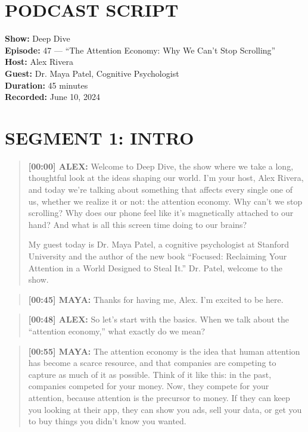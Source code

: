 \documentclass[
    language=english,
    doctype=podcast-script,
    institution=none,
]{../../omnilatex}
\begin{document}
\maketitle

\section*{PODCAST SCRIPT}

\textbf{Show:} Deep Dive\\
\textbf{Episode:} 47 --- ``The Attention Economy: Why We Can't Stop Scrolling''\\
\textbf{Host:} Alex Rivera\\
\textbf{Guest:} Dr. Maya Patel, Cognitive Psychologist\\
\textbf{Duration:} 45 minutes\\
\textbf{Recorded:} June 10, 2024

\section*{SEGMENT 1: INTRO}

\begin{quote}
\textbf{[00:00] ALEX:} Welcome to Deep Dive, the show where we take a long, thoughtful look at the ideas shaping our world. I'm your host, Alex Rivera, and today we're talking about something that affects every single one of us, whether we realize it or not: the attention economy. Why can't we stop scrolling? Why does our phone feel like it's magnetically attached to our hand? And what is all this screen time doing to our brains?

My guest today is Dr. Maya Patel, a cognitive psychologist at Stanford University and the author of the new book ``Focused: Reclaiming Your Attention in a World Designed to Steal It.'' Dr. Patel, welcome to the show.
\end{quote}

\begin{quote}
\textbf{[00:45] MAYA:} Thanks for having me, Alex. I'm excited to be here.
\end{quote}

\begin{quote}
\textbf{[00:48] ALEX:} So let's start with the basics. When we talk about the ``attention economy,'' what exactly do we mean?
\end{quote}

\begin{quote}
\textbf{[00:55] MAYA:} The attention economy is the idea that human attention has become a scarce resource, and that companies are competing to capture as much of it as possible. Think of it like this: in the past, companies competed for your money. Now, they compete for your attention, because attention is the precursor to money. If they can keep you looking at their app, they can show you ads, sell your data, or get you to buy things you didn't know you wanted.
\end{quote}
\end{document}
